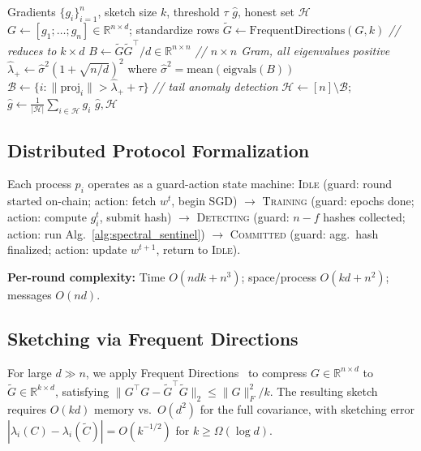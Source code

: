 \documentclass[runningheads]{llncs}
\begin{document}
\begin{algorithm}[t]
\caption{Spectral Sentinel Aggregation (one round)}
\label{alg:spectral_sentinel}
\begin{algorithmic}[1]
\Require Gradients $\{g_i\}_{i=1}^n$, sketch size $k$, threshold $\tau$
\Ensure $\hat{g}$, honest set $\mathcal{H}$
\State $G \leftarrow [g_1;\ldots;g_n] \in \mathbb{R}^{n \times d}$; standardize rows
\State $\tilde{G} \leftarrow \text{FrequentDirections}(G, k)$ \hfill \textit{// reduces to $k\times d$}
\State $B \leftarrow \tilde{G}\tilde{G}^\top / d \in \mathbb{R}^{n\times n}$ \hfill \textit{// $n{\times}n$ Gram, all eigenvalues positive}
\State $\hat{\lambda}_+ \leftarrow \hat{\sigma}^2(1+\sqrt{n/d})^2$ where $\hat{\sigma}^2 = \text{mean}(\text{eigvals}(B))$
\State $\mathcal{B} \leftarrow \{i : \|\text{proj}_i\| > \hat{\lambda}_+ + \tau\}$ \hfill \textit{// tail anomaly detection}
\State $\mathcal{H} \leftarrow [n]\setminus\mathcal{B}$; $\hat{g} \leftarrow \frac{1}{|\mathcal{H}|}\sum_{i\in\mathcal{H}} g_i$
\State \Return $\hat{g}, \mathcal{H}$
\end{algorithmic}
\end{algorithm}

\subsection{Distributed Protocol Formalization}

Each process $p_i$ operates as a guard-action state machine: \textsc{Idle} (guard: round started on-chain; action: fetch $w^t$, begin SGD) $\to$ \textsc{Training} (guard: epochs done; action: compute $g_i^t$, submit hash) $\to$ \textsc{Detecting} (guard: $n{-}f$ hashes collected; action: run Alg.~\ref{alg:spectral_sentinel}) $\to$ \textsc{Committed} (guard: agg.\ hash finalized; action: update $w^{t+1}$, return to \textsc{Idle}).

\noindent\textbf{Per-round complexity:} Time $O(ndk + n^3)$; space/process $O(kd + n^2)$; messages $O(nd)$.

\subsection{Sketching via Frequent Directions}

For large $d\gg n$, we apply Frequent Directions~\cite{frequent_directions} to compress $G\in\mathbb{R}^{n\times d}$ to $\tilde{G}\in\mathbb{R}^{k\times d}$, satisfying $\|G^\top G - \tilde{G}^\top\tilde{G}\|_2 \leq \|G\|_F^2/k$. The resulting sketch requires $O(kd)$ memory vs.\ $O(d^2)$ for the full covariance, with sketching error $|\lambda_i(C) - \lambda_i(\tilde{C})| = O(k^{-1/2})$ for $k \geq \Omega(\log d)$.
\end{document}

